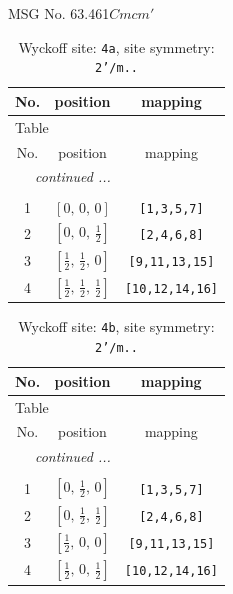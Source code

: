 \documentclass[fleqn,8pt]{jsarticle}
\begin{document}
\setcounter{MaxMatrixCols}{32}

\renewcommand{\tablename}{Table~}
\renewcommand{\figurename}{Figure~}
\begin{center}
\LARGE
MSG No. 63.461\quad$Cmcm'$
\end{center}
\renewcommand{\arraystretch}{1.2}
\begin{longtable}{ccc}
\caption{Wyckoff site: {\tt 4a}, site symmetry: {\tt 2'/m..}}
 \\
 \hline \hline
No. & position & mapping \\ \hline \endfirsthead

\multicolumn{2}{l}{\tablename\ \thetable{}} \\
 \hline \hline
No. & position & mapping \\ \hline \endhead

 \hline \hline
\multicolumn{2}{r}{\footnotesize\it continued ...} \\ \endfoot

 \hline \hline
\multicolumn{2}{r}{} \\ \endlastfoot

1 & $\left[ 0,\, 0,\, 0 \right]$ & {\tt [1,3,5,7]} \\ \hline
2 & $\left[ 0,\, 0,\, \frac{1}{2} \right]$ & {\tt [2,4,6,8]} \\ \hline
3 & $\left[ \frac{1}{2},\, \frac{1}{2},\, 0 \right]$ & {\tt [9,11,13,15]} \\ \hline
4 & $\left[ \frac{1}{2},\, \frac{1}{2},\, \frac{1}{2} \right]$ & {\tt [10,12,14,16]} \\
\end{longtable}
\renewcommand{\arraystretch}{1.2}
\begin{longtable}{ccc}
\caption{Wyckoff site: {\tt 4b}, site symmetry: {\tt 2'/m..}}
 \\
 \hline \hline
No. & position & mapping \\ \hline \endfirsthead

\multicolumn{2}{l}{\tablename\ \thetable{}} \\
 \hline \hline
No. & position & mapping \\ \hline \endhead

 \hline \hline
\multicolumn{2}{r}{\footnotesize\it continued ...} \\ \endfoot

 \hline \hline
\multicolumn{2}{r}{} \\ \endlastfoot

1 & $\left[ 0,\, \frac{1}{2},\, 0 \right]$ & {\tt [1,3,5,7]} \\ \hline
2 & $\left[ 0,\, \frac{1}{2},\, \frac{1}{2} \right]$ & {\tt [2,4,6,8]} \\ \hline
3 & $\left[ \frac{1}{2},\, 0,\, 0 \right]$ & {\tt [9,11,13,15]} \\ \hline
4 & $\left[ \frac{1}{2},\, 0,\, \frac{1}{2} \right]$ & {\tt [10,12,14,16]} \\
\end{longtable}
\end{document}
